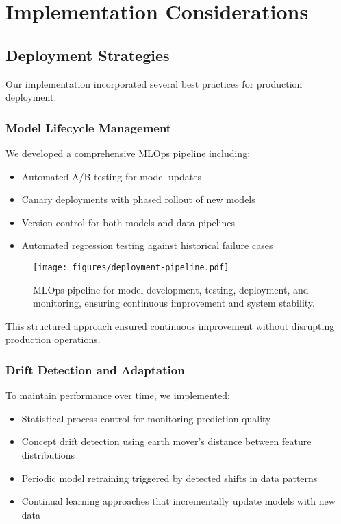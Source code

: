 \section{Implementation Considerations}
\subsection{Deployment Strategies}
Our implementation incorporated several best practices for production deployment:

\subsubsection{Model Lifecycle Management}
We developed a comprehensive MLOps pipeline including:
\begin{itemize}
    \item Automated A/B testing for model updates
    \item Canary deployments with phased rollout of new models
    \item Version control for both models and data pipelines
    \item Automated regression testing against historical failure cases
\end{itemize}

\begin{figure}[t]
\centering
\texttt{[image: figures/deployment-pipeline.pdf]}
\caption{MLOps pipeline for model development, testing, deployment, and monitoring, ensuring continuous improvement and system stability.}
\label{fig:deployment_pipeline}
\end{figure}

This structured approach ensured continuous improvement without disrupting production operations.

\subsubsection{Drift Detection and Adaptation}
To maintain performance over time, we implemented:
\begin{itemize}
    \item Statistical process control for monitoring prediction quality
    \item Concept drift detection using earth mover's distance between feature distributions
    \item Periodic model retraining triggered by detected shifts in data patterns
    \item Continual learning approaches that incrementally update models with new data
\end{itemize}


